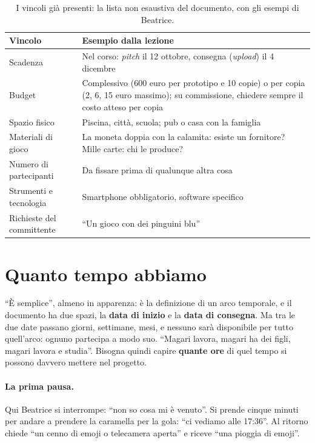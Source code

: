 \begin{table}[htbp]
\centering
\small
\begin{tabular}{@{}p{3.2cm}p{10cm}@{}}
\toprule
\textbf{Vincolo} & \textbf{Esempio dalla lezione} \\
\midrule
Scadenza & Nel corso: \emph{pitch} il 12 ottobre, consegna (\emph{upload}) il 4
  dicembre \\
Budget & Complessivo (600 euro per prototipo e 10 copie) o per copia (2, 6, 15 euro
  massimo); su commissione, chiedere sempre il costo atteso per copia \\
Spazio fisico & Piscina, città, scuola; pub o casa con la famiglia \\
Materiali di gioco & La moneta doppia con la calamita: esiste un fornitore? Mille
  carte: chi le produce? \\
Numero di partecipanti & Da fissare prima di qualunque altra cosa \\
Strumenti e tecnologia & Smartphone obbligatorio, software specifico \\
Richieste del committente & ``Un gioco con dei pinguini blu'' \\
\bottomrule
\end{tabular}
\caption{I vincoli già presenti: la lista non esaustiva del documento, con gli
esempi di Beatrice.}
\label{a9:tab:vincoli}
\end{table}

\section{Quanto tempo abbiamo}
\label{a9:sec:tempo}



``È semplice'', almeno in apparenza: è la definizione di un arco temporale, e il
documento ha due spazi, la \textbf{data di inizio} e la \textbf{data di consegna}. Ma
tra le due date passano giorni, settimane, mesi, e nessuno sarà disponibile per tutto
quell'arco: ognuno partecipa a modo suo. ``Magari lavora, magari ha dei figli, magari
lavora e studia''. Bisogna quindi capire \textbf{quante ore} di quel tempo si possono
davvero mettere nel progetto.

\paragraph{La prima pausa.} Qui Beatrice si interrompe: ``non so cosa mi è venuto''.
Si prende cinque minuti per andare a prendere la caramella per la gola: ``ci vediamo
alle 17:36''. Al ritorno chiede ``un cenno di emoji o telecamera aperta'' e riceve
``una pioggia di emoji''.

